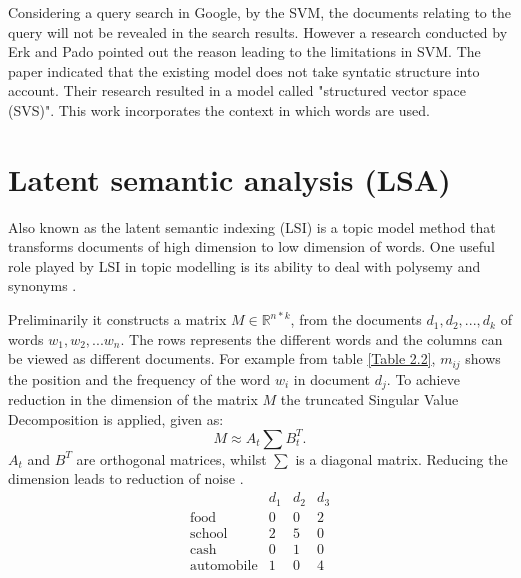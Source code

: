 Considering a query search in Google, by the SVM, the documents relating to the query will not be revealed in the search results. However a research conducted by Erk and Pado pointed out the reason leading to the limitations in SVM.
The paper indicated that the existing model does not take syntatic structure into account. Their research resulted in a model called "structured vector space (SVS)". This work incorporates the context in which words are used.
%

\section{Latent semantic analysis (LSA)}
\begin{flushleft}
Also known as the latent semantic indexing (LSI) is a topic model method
that transforms documents of high dimension to low dimension of words. One useful role played by LSI in topic modelling is its ability to deal with polysemy and synonyms \cite{deerwester1990indexing}.
\end{flushleft} 
Preliminarily it constructs a matrix $M\in \mathbb{R}^{n*k}$, from the documents $d_1, d_2,..., d_k$ of words $w_1, w_2, ... w_n$. The rows represents the different words and the columns can be viewed as different documents.
For example from table \ref{Table 2.2}, $m_{ij}$ shows the position and the frequency of the word $w_i$ in document $d_j$.
To achieve reduction in the dimension of the matrix $M$ the truncated Singular Value Decomposition is applied, given as:
$$M\approx A_t \sum B^{T}_t.$$
$A_t$ and $B^T$ are orthogonal matrices, whilst $ \sum$ is a diagonal matrix.
Reducing the dimension leads to reduction of noise \cite{deerwester1990indexing}.
\label{Table 2.2}
$$\begin{array}{cccc}
 &d_1 & d_2 &d_3 \\ 
 \text{food} & 0 & 0 & 2 \\ 
 \text{school} & 2 & 5 & 0 \\ 
 \text{cash} & 0 & 1 & 0 \\ 
 \text{automobile} & 1 & 0 & 4
  \end{array} $$
